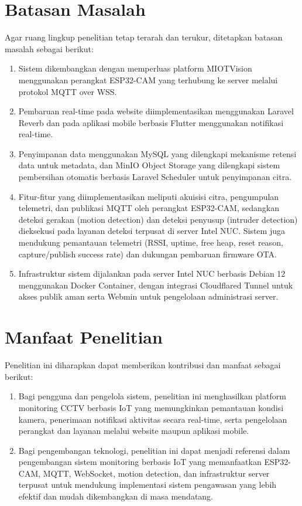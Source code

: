 \section{Batasan Masalah}
Agar ruang lingkup penelitian tetap terarah dan terukur, ditetapkan batasan masalah sebagai berikut:
\begin{enumerate}
	\item Sistem dikembangkan dengan memperluas platform MIOTVision menggunakan perangkat ESP32-CAM yang terhubung ke server melalui protokol MQTT over WSS.
	
	\item Pembaruan real-time pada website diimplementasikan menggunakan Laravel Reverb dan pada aplikasi mobile berbasis Flutter menggunakan notifikasi real-time.
	
	\item Penyimpanan data menggunakan MySQL yang dilengkapi mekanisme retensi data untuk metadata, dan MinIO Object Storage yang dilengkapi sistem pembersihan otomatis berbasis Laravel Scheduler untuk penyimpanan citra.
	
	\item Fitur-fitur yang diimplementasikan meliputi akuisisi citra, pengumpulan telemetri, dan publikasi MQTT oleh perangkat ESP32-CAM, sedangkan deteksi gerakan (motion detection) dan deteksi penyusup (intruder detection) dieksekusi pada layanan deteksi terpusat di server Intel NUC. Sistem juga mendukung pemantauan telemetri (RSSI, uptime, free heap, reset reason, capture/publish success rate) dan dukungan pembaruan firmware OTA.
	
	\item Infrastruktur sistem dijalankan pada server Intel NUC berbasis Debian 12 menggunakan Docker Container, dengan integrasi Cloudflared Tunnel untuk akses publik aman serta Webmin untuk pengelolaan administrasi server.
\end{enumerate}

\section{Manfaat Penelitian}
Penelitian ini diharapkan dapat memberikan kontribusi dan manfaat sebagai berikut:

\begin{enumerate}
	\item Bagi pengguna dan pengelola sistem, penelitian ini menghasilkan platform monitoring CCTV berbasis IoT yang memungkinkan pemantauan kondisi kamera, penerimaan notifikasi aktivitas secara real-time, serta pengelolaan perangkat dan layanan melalui website maupun aplikasi mobile.
	
	\item Bagi pengembangan teknologi, penelitian ini dapat menjadi referensi dalam pengembangan sistem monitoring berbasis IoT yang memanfaatkan ESP32-CAM, MQTT, WebSocket, motion detection, dan infrastruktur server terpusat untuk mendukung implementasi sistem pengawasan yang lebih efektif dan mudah dikembangkan di masa mendatang.
\end{enumerate}

